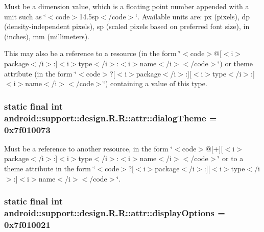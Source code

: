 Must be a dimension value, which is a floating point number appended with a unit such as \char`\"{}$<$code$>$14.5sp$<$/code$>$\char`\"{}. Available units are: px (pixels), dp (density-independent pixels), sp (scaled pixels based on preferred font size), in (inches), mm (millimeters). 

This may also be a reference to a resource (in the form \char`\"{}$<$code$>$@\mbox{[}$<$i$>$package$<$/i$>$:\mbox{]}$<$i$>$type$<$/i$>$:$<$i$>$name$<$/i$>$$<$/code$>$\char`\"{}) or theme attribute (in the form \char`\"{}$<$code$>$?\mbox{[}$<$i$>$package$<$/i$>$:\mbox{]}\mbox{[}$<$i$>$type$<$/i$>$:\mbox{]}$<$i$>$name$<$/i$>$$<$/code$>$\char`\"{}) containing a value of this type. \hypertarget{classandroid_1_1support_1_1design_1_1_r_1_1attr_d9ff5b32879c4bc656a7a74012e9032b}{
\subsubsection[{dialogTheme}]{\setlength{\rightskip}{0pt plus 5cm}static final int android::support::design.R.R::attr::dialogTheme = 0x7f010073}}
\label{classandroid_1_1support_1_1design_1_1_r_1_1attr_d9ff5b32879c4bc656a7a74012e9032b}


Must be a reference to another resource, in the form \char`\"{}$<$code$>$@\mbox{[}+\mbox{]}\mbox{[}$<$i$>$package$<$/i$>$:\mbox{]}$<$i$>$type$<$/i$>$:$<$i$>$name$<$/i$>$$<$/code$>$\char`\"{} or to a theme attribute in the form \char`\"{}$<$code$>$?\mbox{[}$<$i$>$package$<$/i$>$:\mbox{]}\mbox{[}$<$i$>$type$<$/i$>$:\mbox{]}$<$i$>$name$<$/i$>$$<$/code$>$\char`\"{}. \hypertarget{classandroid_1_1support_1_1design_1_1_r_1_1attr_5b757886dbd75d3b33b225da199c258f}{
\subsubsection[{displayOptions}]{\setlength{\rightskip}{0pt plus 5cm}static final int android::support::design.R.R::attr::displayOptions = 0x7f010021}}
\label{classandroid_1_1support_1_1design_1_1_r_1_1attr_5b757886dbd75d3b33b225da199c258f}


